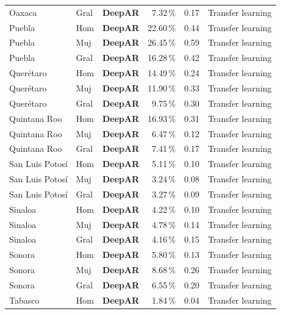 \documentclass[12pt, letterpaper]{article}
\begin{document}
\begin{longtable}{l l >{\bfseries}c r r l}
Oaxaca & Gral & \textcolor{cdeepar}{\textbf{DeepAR}} & 7.32\,\% & 0.17 & Transfer learning \\
Puebla & Hom & \textcolor{cdeepar}{\textbf{DeepAR}} & 22.60\,\% & 0.44 & Transfer learning \\
Puebla & Muj & \textcolor{cdeepar}{\textbf{DeepAR}} & 26.45\,\% & 0.59 & Transfer learning \\
Puebla & Gral & \textcolor{cdeepar}{\textbf{DeepAR}} & 16.28\,\% & 0.42 & Transfer learning \\
Querétaro & Hom & \textcolor{cdeepar}{\textbf{DeepAR}} & 14.49\,\% & 0.24 & Transfer learning \\
Querétaro & Muj & \textcolor{cdeepar}{\textbf{DeepAR}} & 11.90\,\% & 0.33 & Transfer learning \\
Querétaro & Gral & \textcolor{cdeepar}{\textbf{DeepAR}} & 9.75\,\% & 0.30 & Transfer learning \\
Quintana Roo & Hom & \textcolor{cdeepar}{\textbf{DeepAR}} & 16.93\,\% & 0.31 & Transfer learning \\
Quintana Roo & Muj & \textcolor{cdeepar}{\textbf{DeepAR}} & 6.47\,\% & 0.12 & Transfer learning \\
Quintana Roo & Gral & \textcolor{cdeepar}{\textbf{DeepAR}} & 7.41\,\% & 0.17 & Transfer learning \\
San Luis Potosí & Hom & \textcolor{cdeepar}{\textbf{DeepAR}} & 5.11\,\% & 0.10 & Transfer learning \\
San Luis Potosí & Muj & \textcolor{cdeepar}{\textbf{DeepAR}} & 3.24\,\% & 0.08 & Transfer learning \\
San Luis Potosí & Gral & \textcolor{cdeepar}{\textbf{DeepAR}} & 3.27\,\% & 0.09 & Transfer learning \\
Sinaloa & Hom & \textcolor{cdeepar}{\textbf{DeepAR}} & 4.22\,\% & 0.10 & Transfer learning \\
Sinaloa & Muj & \textcolor{cdeepar}{\textbf{DeepAR}} & 4.78\,\% & 0.14 & Transfer learning \\
Sinaloa & Gral & \textcolor{cdeepar}{\textbf{DeepAR}} & 4.16\,\% & 0.15 & Transfer learning \\
Sonora & Hom & \textcolor{cdeepar}{\textbf{DeepAR}} & 5.80\,\% & 0.13 & Transfer learning \\
Sonora & Muj & \textcolor{cdeepar}{\textbf{DeepAR}} & 8.68\,\% & 0.26 & Transfer learning \\
Sonora & Gral & \textcolor{cdeepar}{\textbf{DeepAR}} & 6.55\,\% & 0.20 & Transfer learning \\
Tabasco & Hom & \textcolor{cdeepar}{\textbf{DeepAR}} & 1.84\,\% & 0.04 & Transfer learning \\

\end{longtable}
\end{document}
